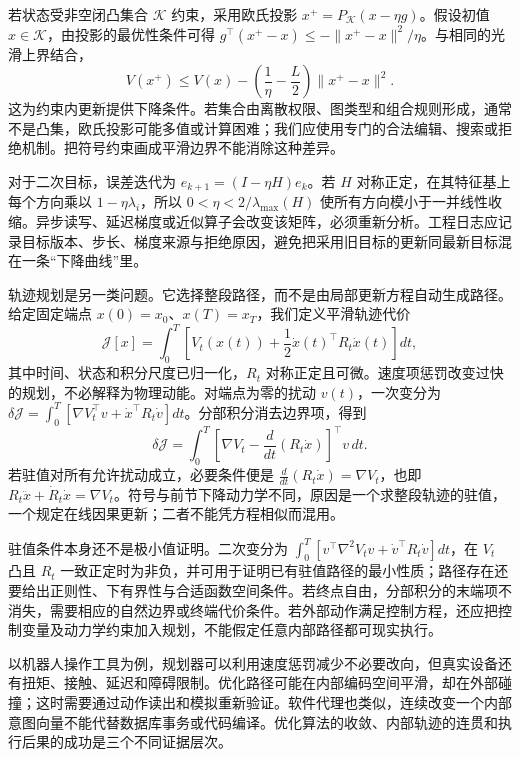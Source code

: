 若状态受非空闭凸集合 $\mathcal K$ 约束，采用欧氏投影 $x^+=P_{\mathcal K}(x-\eta g)$。假设初值 $x\in\mathcal K$，由投影的最优性条件可得 $g^\top(x^+-x)\le-\|x^+-x\|^2/\eta$。与相同的光滑上界结合，
\begin{equation}
 V(x^+)\le V(x)-\left(\frac1\eta-\frac L2\right)\|x^+-x\|^2.
\end{equation}
这为约束内更新提供下降条件。若集合由离散权限、图类型和组合规则形成，通常不是凸集，欧氏投影可能多值或计算困难；我们应使用专门的合法编辑、搜索或拒绝机制。把符号约束画成平滑边界不能消除这种差异。

对于二次目标，误差迭代为 $e_{k+1}=(I-\eta H)e_k$。若 $H$ 对称正定，在其特征基上每个方向乘以 $1-\eta\lambda_i$，所以 $0<\eta<2/\lambda_{\max}(H)$ 使所有方向模小于一并线性收缩。异步读写、延迟梯度或近似算子会改变该矩阵，必须重新分析。工程日志应记录目标版本、步长、梯度来源与拒绝原因，避免把采用旧目标的更新同最新目标混在一条“下降曲线”里。

轨迹规划是另一类问题。它选择整段路径，而不是由局部更新方程自动生成路径。给定固定端点 $x(0)=x_0$、$x(T)=x_T$，我们定义平滑轨迹代价
\begin{equation}
 \mathcal J[x]=\int_0^T
 \left[V_t(x(t))+\frac12\dot x(t)^\top R_t\dot x(t)\right]dt,
\end{equation}
其中时间、状态和积分尺度已归一化，$R_t$ 对称正定且可微。速度项惩罚改变过快的规划，不必解释为物理动能。对端点为零的扰动 $v(t)$，一次变分为 $\delta\mathcal J=\int_0^T[\nabla V_t^\top v+\dot x^\top R_t\dot v]dt$。分部积分消去边界项，得到
\begin{equation}
 \delta\mathcal J=\int_0^T
 \left[\nabla V_t-\frac{d}{dt}(R_t\dot x)\right]^\top v\,dt.
\end{equation}
若驻值对所有允许扰动成立，必要条件便是 $\frac{d}{dt}(R_t\dot x)=\nabla V_t$，也即 $R_t\ddot x+\dot R_t\dot x=\nabla V_t$。符号与前节下降动力学不同，原因是一个求整段轨迹的驻值，一个规定在线因果更新；二者不能凭方程相似而混用。

驻值条件本身还不是极小值证明。二次变分为 $\int_0^T[v^\top\nabla^2V_tv+\dot v^\top R_t\dot v]dt$，在 $V_t$ 凸且 $R_t$ 一致正定时为非负，并可用于证明已有驻值路径的最小性质；路径存在还要给出正则性、下有界性与合适函数空间条件。若终点自由，分部积分的末端项不消失，需要相应的自然边界或终端代价条件。若外部动作满足控制方程，还应把控制变量及动力学约束加入规划，不能假定任意内部路径都可现实执行。

以机器人操作工具为例，规划器可以利用速度惩罚减少不必要改向，但真实设备还有扭矩、接触、延迟和障碍限制。优化路径可能在内部编码空间平滑，却在外部碰撞；这时需要通过动作读出和模拟重新验证。软件代理也类似，连续改变一个内部意图向量不能代替数据库事务或代码编译。优化算法的收敛、内部轨迹的连贯和执行后果的成功是三个不同证据层次。

